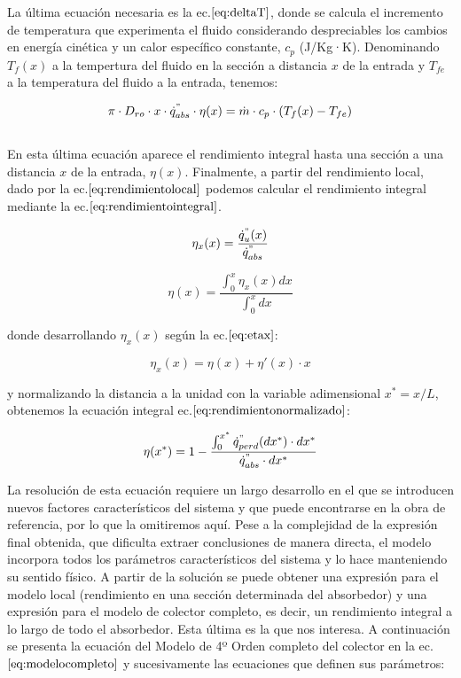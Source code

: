 La última ecuación necesaria es la ec.\(\eqref{eq:deltaT}\), donde se
calcula el incremento de temperatura que experimenta el fluido
considerando despreciables los cambios en energía cinética y un calor
específico constante, \(c_{p}\) (J/Kg·K). Denominando \(T_{f}(x)\) a la
tempertura del fluido en la sección a distancia \(x\) de la entrada y
\(T_{fe}\) a la temperatura del fluido a la entrada, tenemos:

\begin{equation}
    \pi \cdot D_{ro} \cdot x \cdot \dot{q}^{"}_{abs} \cdot \eta(x)= \dot{m} \cdot c_{p} \cdot (T_{f}(x)-T_{fe}) \label{eq:deltaT}
\end{equation}\\

En esta última ecuación aparece el rendimiento integral hasta una
sección a una distancia \(x\) de la entrada, \(\eta(x)\). Finalmente, a
partir del rendimiento local, dado por la
ec.\(\eqref{eq:rendimientolocal}\) podemos calcular el rendimiento
integral mediante la ec.\(\eqref{eq:rendimientointegral}\).

\begin{equation}
    \eta_{x}(x) = \frac{\dot{q}^{"}_{u}(x)}{\dot{q}^{"}_{abs}} \label{eq:rendimientolocal}
\end{equation}

\begin{equation}
    \eta(x) = \frac{\int_{0}^{x}\eta_{x}(x)dx}{\int_{0}^{x}dx} \label{eq:rendimientointegral}
\end{equation}

donde desarrollando \(\eta_{x}(x)\) según la ec.\(\eqref{eq:etax}\):

\begin{equation}
    \eta_{x}(x) = \eta(x) + \eta'(x)\cdot x  \label{eq:etax}
\end{equation}

y normalizando la distancia a la unidad con la variable adimensional
\(x^{*}=x/L\), obtenemos la ecuación integral
ec.\(\eqref{eq:rendimientonormalizado}\):

\begin{equation}
    \eta(x^{*}) = 1 - \frac{\int_{0}^{x^{*}} \dot{q}^{"}_{perd}(dx^{*})\cdot dx^{*}}{\dot{q}^{"}_{abs}\cdot dx^{*}} \label{eq:rendimientonormalizado}
\end{equation}

La resolución de esta ecuación requiere un largo desarrollo en el que se
introducen nuevos factores característicos del sistema y que puede
encontrarse en la obra de referencia, por lo que la omitiremos aquí.
Pese a la complejidad de la expresión final obtenida, que dificulta
extraer conclusiones de manera directa, el modelo incorpora todos los
parámetros característicos del sistema y lo hace manteniendo su sentido
físico. A partir de la solución se puede obtener una expresión para el
modelo local (rendimiento en una sección determinada del absorbedor) y
una expresión para el modelo de colector completo, es decir, un
rendimiento integral a lo largo de todo el absorbedor. Esta última es la
que nos interesa. A continuación se presenta la ecuación del Modelo de
4º Orden completo del colector en la ec.\(\eqref{eq:modelocompleto}\) y
sucesivamente las ecuaciones que definen sus parámetros:

